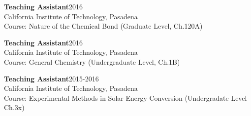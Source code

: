 \documentclass[letterpaper]{article}
\renewenvironment{itemize}{
  \begin{list}{}{
    \setlength{\leftmargin}{1.5em}
  }
}{
  \end{list}
}
\begin{document}
\begin{itemize}

\item \textbf{Teaching Assistant}\hfill 2016\\
      California Institute of Technology, Pasadena \\
      Course: Nature of the Chemical Bond (Graduate Level, Ch.120A)
\item \textbf{Teaching Assistant}\hfill 2016\\
      California Institute of Technology, Pasadena \\
      Course: General Chemistry (Undergraduate Level, Ch.1B)
\item \textbf{Teaching Assistant}\hfill 2015-2016\\
      California Institute of Technology, Pasadena \\
      Course: Experimental Methods in Solar Energy Conversion (Undergradate
      Level Ch.3x)


\end{itemize}
\end{document}
